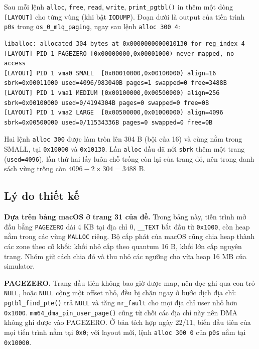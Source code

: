 \documentclass[12pt,a4paper]{article}
\begin{document}
	Sau mỗi lệnh \texttt{alloc}, \texttt{free}, \texttt{read}, \texttt{write}, \texttt{print\_pgtbl()} in thêm một dòng \texttt{[LAYOUT]} cho từng vùng (khi bật \texttt{IODUMP}). Đoạn dưới là output của tiến trình \texttt{p0s} trong \texttt{os\_0\_mlq\_paging}, ngay sau lệnh \texttt{alloc 300 4}:
	\begin{lstlisting}[basicstyle=\ttfamily\scriptsize]
liballoc: allocated 304 bytes at 0x0000000000010130 for reg_index 4
[LAYOUT] PID 1 PAGEZERO [0x00000000,0x00001000) never mapped, no access
[LAYOUT] PID 1 vma0 SMALL  [0x00010000,0x00100000) align=16   sbrk=0x00011000 used=4096/983040B pages=1 swapped=0 free=3488B
[LAYOUT] PID 1 vma1 MEDIUM [0x00100000,0x00500000) align=256  sbrk=0x00100000 used=0/4194304B pages=0 swapped=0 free=0B
[LAYOUT] PID 1 vma2 LARGE  [0x00500000,0x01000000) align=4096 sbrk=0x00500000 used=0/11534336B pages=0 swapped=0 free=0B
	\end{lstlisting}
	Hai lệnh \texttt{alloc 300} được làm tròn lên 304 B (bội của 16) và cùng nằm trong SMALL, tại \texttt{0x10000} và \texttt{0x10130}. Lần \texttt{alloc} đầu đã nới \texttt{sbrk} thêm một trang (\texttt{used=4096}), lần thứ hai lấy luôn chỗ trống còn lại của trang đó, nên trong danh sách vùng trống còn \(4096 - 2 \times 304 = 3488\) B.

	\subsection{Lý do thiết kế}
	\noindent\textbf{Dựa trên bảng macOS ở trang 31 của đề.} Trong bảng này, tiến trình mở đầu bằng \texttt{PAGEZERO} dài 4 KB tại địa chỉ 0, \texttt{\_\_TEXT} bắt đầu từ \texttt{0x1000}, còn heap nằm trong các vùng \texttt{MALLOC} riêng. Bộ cấp phát của macOS cũng chia heap thành các zone theo cỡ khối: khối nhỏ cấp theo quantum 16 B, khối lớn cấp nguyên trang. Nhóm giữ cách chia đó và thu nhỏ các ngưỡng cho vừa heap 16 MB của simulator.

	\medskip
	\noindent\textbf{PAGEZERO.} Trang đầu tiên không bao giờ được map, nên đọc ghi qua con trỏ \texttt{NULL}, hoặc \texttt{NULL} cộng một offset nhỏ, đều bị chặn ngay ở bước dịch địa chỉ: \texttt{pgtbl\_find\_pte()} trả \texttt{NULL} và tăng \texttt{nr\_fault} cho mọi địa chỉ user nhỏ hơn \texttt{0x1000}. \texttt{mm64\_dma\_pin\_user\_page()} cũng từ chối các địa chỉ này nên DMA không ghi được vào PAGEZERO. Ở bản tích hợp ngày 22/11, biến đầu tiên của mọi tiến trình nằm tại \texttt{0x0}; với layout mới, lệnh \texttt{alloc 300 0} của \texttt{p0s} nằm tại \texttt{0x10000}.
\end{document}
